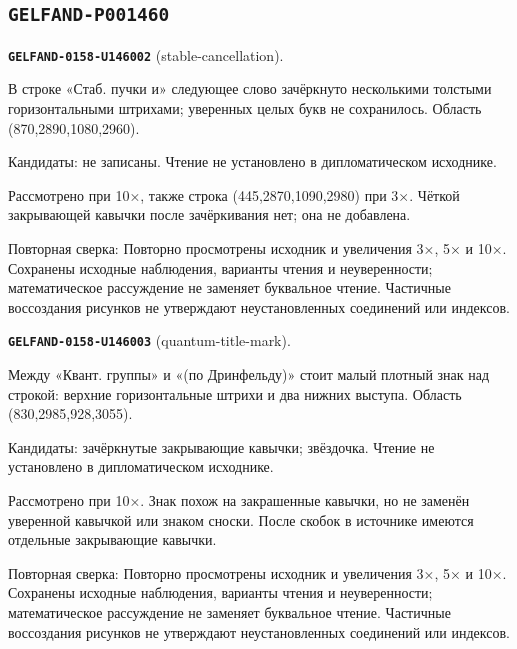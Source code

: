 \subsection*{\texttt{GELFAND-P001460}}
\par\noindent\leavevmode{}\label{GELFAND-0158-U146002}\label{GELFAND-P001460:stable-cancellation}\textbf{\texttt{GELFAND-0158-U146002}} (stable-cancellation).\nopagebreak[4]\par
В строке «Стаб. пучки и» следующее слово зачёркнуто несколькими толстыми горизонтальными штрихами; уверенных целых букв не сохранилось. Область (870,2890,1080,2960).\par
Кандидаты: не записаны. Чтение не установлено в дипломатическом исходнике.\par
Рассмотрено при 10×, также строка (445,2870,1090,2980) при 3×. Чёткой закрывающей кавычки после зачёркивания нет; она не добавлена.\par
Повторная сверка: Повторно просмотрены исходник и увеличения 3×, 5× и 10×. Сохранены исходные наблюдения, варианты чтения и неуверенности; математическое рассуждение не заменяет буквальное чтение. Частичные воссоздания рисунков не утверждают неустановленных соединений или индексов.\par\medskip
\par\noindent\leavevmode{}\label{GELFAND-0158-U146003}\label{GELFAND-P001460:quantum-title-mark}\textbf{\texttt{GELFAND-0158-U146003}} (quantum-title-mark).\nopagebreak[4]\par
Между «Квант. группы» и «(по Дринфельду)» стоит малый плотный знак над строкой: верхние горизонтальные штрихи и два нижних выступа. Область (830,2985,928,3055).\par
Кандидаты: зачёркнутые закрывающие кавычки; звёздочка. Чтение не установлено в дипломатическом исходнике.\par
Рассмотрено при 10×. Знак похож на закрашенные кавычки, но не заменён уверенной кавычкой или знаком сноски. После скобок в источнике имеются отдельные закрывающие кавычки.\par
Повторная сверка: Повторно просмотрены исходник и увеличения 3×, 5× и 10×. Сохранены исходные наблюдения, варианты чтения и неуверенности; математическое рассуждение не заменяет буквальное чтение. Частичные воссоздания рисунков не утверждают неустановленных соединений или индексов.\par\medskip
